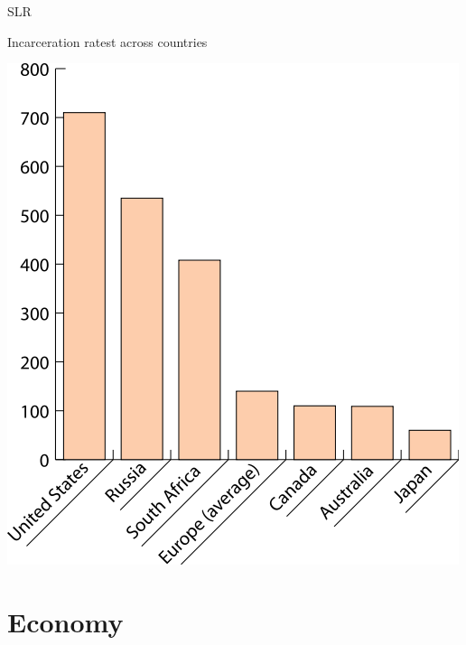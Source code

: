 \documentclass[print,Draft]{faosyb}
\begin{document}
\begin{chart}{S}{LR}
\caption{Incarceration ratest across countries}
\label{chart:incarceration}
\includegraphics[width=\chartwidth,height=\chartheight]{incarceration}  
\end{chart}

\section{Economy}
\end{document}
